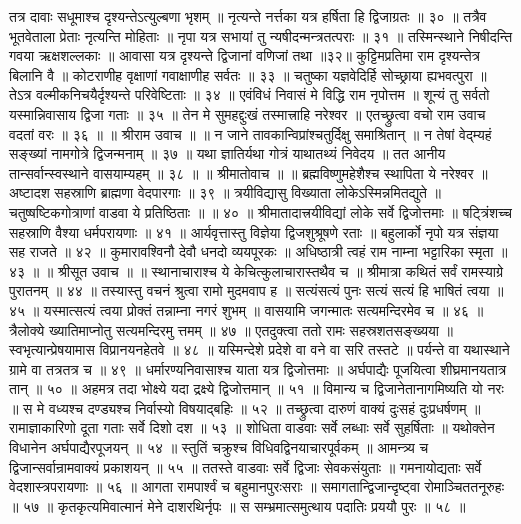 तत्र दावाः सधूमाश्च दृश्यन्तेऽत्युल्बणा भृशम् ॥
नृत्यन्ते नर्त्तका यत्र हर्षिता हि द्विजाग्रतः ॥ ३० ॥
तत्रैव भूतवेताला प्रेताः नृत्यन्ति मोहिताः ॥
नृपा यत्र सभायां तु न्यषीदन्मन्त्रतत्पराः ॥ ३१ ॥
तस्मिन्स्थाने निषीदन्ति गवया ऋक्षशल्लकाः ॥
आवासा यत्र दृश्यन्ते द्विजानां वणिजां तथा ॥३२॥
कुट्टिमप्रतिमा राम दृश्यन्तेत्र बिलानि वै ॥
कोटराणीह वृक्षाणां गवाक्षाणीह सर्वतः ॥ ३३ ॥
चतुष्का यज्ञवेदिर्हि सोच्छ्राया ह्यभवत्पुरा ॥
तेऽत्र वल्मीकनिचयैर्दृश्यन्ते परिवेष्टिताः ॥ ३४ ॥
एवंविधं निवासं मे विद्धि राम नृपोत्तम ॥
शून्यं तु सर्वतो यस्मान्निवासाय द्विजा गताः ॥ ३५ ॥
तेन मे सुमहद्दुःखं तस्मात्त्राहि नरेश्वर ॥
एतच्छ्रुत्वा वचो राम उवाच वदतां वरः ॥ ३६ ॥
॥ श्रीराम उवाच ॥ ॥
न जाने तावकान्विप्रांश्चतुर्दिक्षु समाश्रितान् ॥
न तेषां वेद्म्यहं सङ्ख्यां नामगोत्रे द्विजन्मनाम् ॥ ३७ ॥
यथा ज्ञातिर्यथा गोत्रं याथातथ्यं निवेदय ॥
तत आनीय तान्सर्वान्स्वस्थाने वासयाम्यहम् ॥ ३८ ॥
॥ श्रीमातोवाच ॥ ॥
ब्रह्मविष्णुमहेशैश्च स्थापिता ये नरेश्वर ॥
अष्टादश सहस्राणि ब्राह्मणा वेदपारगाः ॥ ३९ ॥
त्रयीविद्यासु विख्याता लोकेऽस्मिन्नमितद्युते ॥
चतुष्षष्टिकगोत्राणां वाडवा ये प्रतिष्ठिताः ॥ ॥ ४० ॥
श्रीमातादात्त्रयीविद्यां लोके सर्वे द्विजोत्तमाः ॥
षट्त्रिंशच्च सहस्राणि वैश्या धर्मपरायणाः ॥ ४१ ॥
आर्यवृत्तास्तु विज्ञेया द्विजशुश्रूषणे रताः ॥
बहुलार्को नृपो यत्र संज्ञया सह राजते ॥ ४२ ॥
कुमारावश्विनौ देवौ धनदो व्ययपूरकः ॥
अधिष्ठात्री त्वहं राम नाम्ना भट्टारिका स्मृता ॥ ४३ ॥
॥ श्रीसूत उवाच ॥ ॥
स्थानाचाराश्च ये केचित्कुलाचारास्तथैव च ॥
श्रीमात्रा कथितं सर्वं रामस्याग्रे पुरातनम् ॥ ४४ ॥
तस्यास्तु वचनं श्रुत्वा रामो मुदमवाप ह ॥
सत्यंसत्यं पुनः सत्यं सत्यं हि भाषितं त्वया ॥ ४५ ॥
यस्मात्सत्यं त्वया प्रोक्तं तन्नाम्ना नगरं शुभम् ॥
वासयामि जगन्मातः सत्यमन्दिरमेव च ॥ ४६ ॥
त्रैलोक्ये ख्यातिमाप्नोतु सत्यमन्दिरमु त्तमम् ॥ ४७ ॥
एतदुक्त्वा ततो रामः सहस्रशतसङ्ख्यया ॥
स्वभृत्यान्प्रेषयामास विप्रानयनहेतवे ॥ ४८ ॥
यस्मिन्देशे प्रदेशे वा वने वा सरि तस्तटे ॥
पर्यन्ते वा यथास्थाने ग्रामे वा तत्रतत्र च ॥ ४९ ॥
धर्मारण्यनिवासाश्च याता यत्र द्विजोत्तमाः ॥
अर्घपाद्यैः पूजयित्वा शीघ्रमानयतात्र तान् ॥ ५० ॥
अहमत्र तदा भोक्ष्ये यदा द्रक्ष्ये द्विजोत्तमान् ॥ ५१ ॥
विमान्य च द्विजानेतानागमिष्यति यो नरः ॥
स मे वध्यश्च दण्ड्यश्च निर्वास्यो विषयाद्बहिः ॥ ५२ ॥
तच्छ्रुत्वा दारुणं वाक्यं दुःसहं दुःप्रधर्षणम् ॥
रामाज्ञाकारिणो दूता गताः सर्वे दिशो दश ॥ ५३ ॥
शोधिता वाडवाः सर्वे लब्धाः सर्वे सुहर्षिताः ॥
यथोक्तेन विधानेन अर्घपाद्यैरपूजयन् ॥ ५४ ॥
स्तुतिं चक्रुश्च विधिवद्विनयाचारपूर्वकम् ॥
आमन्त्र्य च द्विजान्सर्वान्रामवाक्यं प्रकाशयन् ॥ ५५ ॥
ततस्ते वाडवाः सर्वे द्विजाः सेवकसंयुताः ॥
गमनायोद्यताः सर्वे वेदशास्त्रपरायणाः ॥ ५६ ॥
आगता रामपार्श्वं च बहुमानपुरःसराः ॥
समागतान्द्विजान्दृष्ट्वा रोमाञ्चिततनूरुहः ॥ ५७ ॥
कृतकृत्यमिवात्मानं मेने दाशरथिर्नृपः ॥
स सम्भ्रमात्समुत्थाय पदातिः प्रययौ पुरः ॥ ५८ ॥
